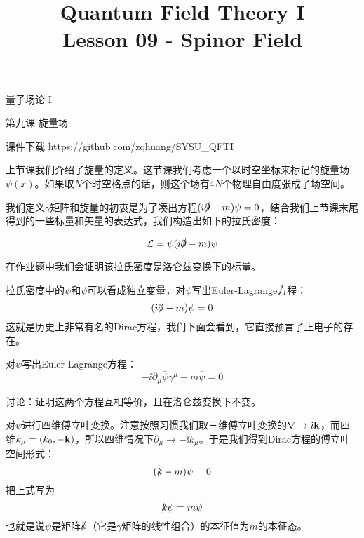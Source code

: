 \documentclass[CJK]{beamer}
\title{Quantum Field Theory I \\ Lesson 09 - Spinor Field}
\author{}
\date{}
\begin{document}
\begin{frame}
 
\begin{center}
\begin{Large}
\bch
量子场论 I 

{\vskip 0.3in}

第九课 旋量场

\ech
\end{Large}
\end{center}

\vskip 0.2in

\bch
课件下载
\ech
https://github.com/zqhuang/SYSU\_QFTI

\end{frame}


\begin{frame}
\bch
上节课我们介绍了旋量的定义。这节课我们考虑一个以时空坐标来标记的旋量场$\psi(x)$。如果取$N$个时空格点的话，则这个场有$4N$个物理自由度张成了场空间。
\skipline

我们定义$\gamma$矩阵和旋量的初衷是为了凑出方程$({\dot{\imath}}\slashed{\partial} - m) \psi = 0$，结合我们上节课末尾得到的一些标量和矢量的表达式，我们构造出如下的拉氏密度：

$${\mathcal{L}} = \bar\psi ({\dot{\imath}}\slashed{\partial} - m) \psi$$

\skipline

在作业题中我们会证明该拉氏密度是洛仑兹变换下的标量。

\ech
\end{frame}

\begin{frame}
\bch
拉氏密度中的$\bar\psi$和$\psi$可以看成独立变量，对$\bar\psi$写出Euler-Lagrange方程：
$$ ({\dot{\imath}}\slashed{\partial} - m) \psi = 0 $$
这就是历史上非常有名的Dirac方程，我们下面会看到，它直接预言了正电子的存在。

\skipline
对$\psi$写出Euler-Lagrange方程：
$$-\ii\partial_\mu \bar\psi \gamma^\mu - m \bar\psi = 0$$

\skipline
讨论：证明这两个方程互相等价，且在洛仑兹变换下不变。
\ech
\end{frame}

\begin{frame}
\bch
对$\psi$进行四维傅立叶变换。注意按照习惯我们取三维傅立叶变换的$\nabla \rightarrow {\dot{\imath}} {\mathbf{k}} $，而四维$k_\mu = ( k_0, -{\mathbf{k}})$，所以四维情况下$\partial_\mu \rightarrow - \ii k_\mu$。于是我们得到Dirac方程的傅立叶空间形式：
$$ (\slashed{k} - m) \psi = 0$$
把上式写为
$$\slashed{k} \psi = m \psi$$
也就是说$\psi$是矩阵$\slashed{k}$（它是$\gamma$矩阵的线性组合）的本征值为$m$的本征态。

\ech
\end{frame}
\end{document}
